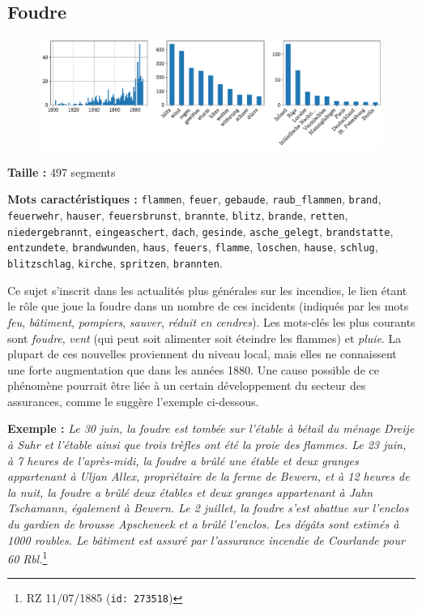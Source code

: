 \documentclass[a4paper,twoside,12pt]{article}
\begin{document}
\subsection{Foudre} \label{topic15_foudre}

\begin{figure}[H]
\centering
\includegraphics[width=\textwidth]{images/topic_charts_15.pdf}
\end{figure}

\begin{flushleft}
\textbf{Taille :} 497 segments

\textbf{Mots caractéristiques :} \texttt{flammen}, \texttt{feuer}, \texttt{gebaude}, \texttt{raub\_flammen}, \texttt{brand}, \texttt{feuerwehr}, \texttt{hauser}, \texttt{feuersbrunst}, \texttt{brannte}, \texttt{blitz}, \texttt{brande}, \texttt{retten}, \texttt{niedergebrannt}, \texttt{eingeaschert}, \texttt{dach}, \texttt{gesinde}, \texttt{asche\_gelegt}, \texttt{brandstatte}, \texttt{entzundete}, \texttt{brandwunden}, \texttt{haus}, \texttt{feuers}, \texttt{flamme}, \texttt{loschen}, \texttt{hause}, \texttt{schlug}, \texttt{blitzschlag}, \texttt{kirche}, \texttt{spritzen}, \texttt{brannten}.
\end{flushleft}

\noindent Ce sujet s'inscrit dans les actualités plus générales sur les incendies, le lien étant le rôle que joue la foudre dans un nombre de ces incidents (indiqués par les mots \textit{feu}, \textit{bâtiment}, \textit{pompiers}, \textit{sauver}, \textit{réduit en cendres}). Les mots-clés les plus courants sont \textit{foudre}, \textit{vent} (qui peut soit alimenter soit éteindre les flammes) et \textit{pluie}. La plupart de ces nouvelles proviennent du niveau local, mais elles ne connaissent une forte augmentation que dans les années 1880. Une cause possible de ce phénomène pourrait être liée à un certain développement du secteur des assurances, comme le suggère l'exemple ci-dessous.

\medskip

\noindent \textbf{Exemple :} \textit{Le 30 juin, la foudre est tombée sur l'étable à bétail du ménage Dreije à Suhr et l'étable ainsi que trois trèfles ont été la proie des flammes. Le 23 juin, à 7 heures de l'après-midi, la foudre a brûlé une étable et deux granges appartenant à Uljan Allex, propriétaire de la ferme de Bewern, et à 12 heures de la nuit, la foudre a brûlé deux étables et deux granges appartenant à Jahn Tschamann, également à Bewern. Le 2 juillet, la foudre s'est abattue sur l'enclos du gardien de brousse Apscheneek et a brûlé l'enclos. Les dégâts sont estimés à 1000 roubles. Le bâtiment est assuré par l'assurance incendie de Courlande pour 60 Rbl.}\footnote{RZ 11/07/1885 (\texttt{id: 273518})}
\end{document}
